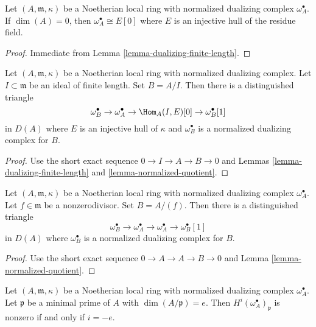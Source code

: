 \begin{lemma}
\label{lemma-dualizing-artinian}
Let $(A, \mathfrak m, \kappa)$ be a Noetherian local
ring with normalized dualizing complex $\omega_A^\bullet$.
If $\dim(A) = 0$, then $\omega_A^\bullet \cong E[0]$
where $E$ is an injective hull of the residue field.
\end{lemma}

\begin{proof}
Immediate from Lemma \ref{lemma-dualizing-finite-length}.
\end{proof}

\begin{lemma}
\label{lemma-divide-by-finite-length-ideal}
Let $(A, \mathfrak m, \kappa)$ be a Noetherian local
ring with normalized dualizing complex. Let $I \subset \mathfrak m$ be an
ideal of finite length. Set $B = A/I$. Then there is a distinguished
triangle
$$
\omega_B^\bullet \to \omega_A^\bullet \to \Hom_A(I, E)[0] \to
\omega_B^\bullet[1]
$$
in $D(A)$ where $E$ is an injective hull of $\kappa$ and
$\omega_B^\bullet$ is a normalized dualizing complex for $B$.
\end{lemma}

\begin{proof}
Use the short exact sequence $0 \to I \to A \to B \to 0$
and Lemmas \ref{lemma-dualizing-finite-length} and
\ref{lemma-normalized-quotient}.
\end{proof}

\begin{lemma}
\label{lemma-divide-by-nonzerodivisor}
Let $(A, \mathfrak m, \kappa)$ be a Noetherian local
ring with normalized dualizing complex $\omega_A^\bullet$.
Let $f \in \mathfrak m$ be a
nonzerodivisor. Set $B = A/(f)$. Then there is a distinguished
triangle
$$
\omega_B^\bullet \to \omega_A^\bullet \to \omega_A^\bullet \to
\omega_B^\bullet[1]
$$
in $D(A)$ where $\omega_B^\bullet$ is a normalized dualizing complex
for $B$.
\end{lemma}

\begin{proof}
Use the short exact sequence $0 \to A \to A \to B \to 0$
and Lemma \ref{lemma-normalized-quotient}.
\end{proof}

\begin{lemma}
\label{lemma-nonvanishing-generically-local}
Let $(A, \mathfrak m, \kappa)$ be a Noetherian local ring with
normalized dualizing complex $\omega_A^\bullet$.
Let $\mathfrak p$ be a minimal prime of $A$ with
$\dim(A/\mathfrak p) = e$. Then
$H^i(\omega_A^\bullet)_\mathfrak p$ is nonzero
if and only if $i = -e$.
\end{lemma}

